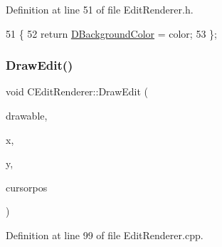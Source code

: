 Definition at line 51 of file Edit\+Renderer.\+h.


\begin{DoxyCode}
51                                                         \{
52             \textcolor{keywordflow}{return} \hyperlink{classCEditRenderer_a7e5e1b18db4c53fe288c200aed673ccf}{DBackgroundColor} = color;
53         \};
\end{DoxyCode}
\hypertarget{classCEditRenderer_a3b043cca5f931cdbbfff35d07100be5e}{}\label{classCEditRenderer_a3b043cca5f931cdbbfff35d07100be5e} 
\subsubsection{\texorpdfstring{Draw\+Edit()}{DrawEdit()}}
{\footnotesize\ttfamily void C\+Edit\+Renderer\+::\+Draw\+Edit (\begin{DoxyParamCaption}\item[{Gdk\+Drawable $\ast$}]{drawable,  }\item[{int}]{x,  }\item[{int}]{y,  }\item[{int}]{cursorpos }\end{DoxyParamCaption})}



Definition at line 99 of file Edit\+Renderer.\+cpp.


